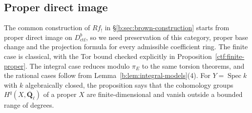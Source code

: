 \documentclass[11pt,a4paper]{article}
\numberwithin{equation}{section}
\theoremstyle{definition}
\theoremstyle{remark}
\newcommand{\Qbar}{\overline{\mathbf Q}_\ell}
\newcommand{\Dctf}{D^b_{\mathrm{ctf}}}
\begin{document}
\subsection{Proper direct image}

The common construction of $Rf_!$ in
\S\ref{b:sec:brown-construction} starts from proper direct image on
$\Dctf$, so we need preservation of this category, proper base change
and the projection formula for every admissible coefficient ring.
The finite case is classical, with the Tor bound checked explicitly in
Proposition~\ref{ctf:finite-proper}. The integral case reduces modulo
$\pi_E$ to the same torsion theorems, and the rational cases follow
from Lemma~\ref{b:lem:integral-models}(4). For $Y=\operatorname{Spec}k$ with
$k$ algebraically closed, the proposition says that the cohomology groups
$H^q(X,\Qbar)$ of a proper $X$ are finite-dimensional and vanish outside
a bounded range of degrees.
\end{document}
